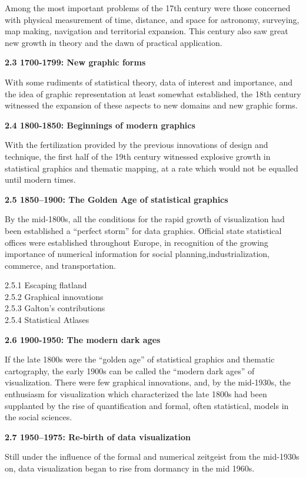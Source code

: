 \documentclass[]{book}
\theoremstyle{definition}
\theoremstyle{definition}
\theoremstyle{definition}
\theoremstyle{remark}
\begin{document}
Among the most important problems of the 17th century were those
concerned with physical measurement of time, distance, and space for
astronomy, surveying, map making, navigation and territorial expansion.
This century also saw great new growth in theory and the dawn of
practical application.

\textbf{2.3 1700-1799: New graphic forms}

With some rudiments of statistical theory, data of interest and
importance, and the idea of graphic representation at least somewhat
established, the 18th century witnessed the expansion of these aspects
to new domains and new graphic forms.

\textbf{2.4 1800-1850: Beginnings of modern graphics}

With the fertilization provided by the previous innovations of design
and technique, the first half of the 19th century witnessed explosive
growth in statistical graphics and thematic mapping, at a rate which
would not be equalled until modern times.

\textbf{2.5 1850--1900: The Golden Age of statistical graphics}

By the mid-1800s, all the conditions for the rapid growth of
visualization had been established a ``perfect storm'' for data
graphics. Official state statistical offices were established throughout
Europe, in recognition of the growing importance of numerical
information for social planning,industrialization, commerce, and
transportation.

2.5.1 Escaping flatland\\
2.5.2 Graphical innovations\\
2.5.3 Galton's contributions\\
2.5.4 Statistical Atlases

\textbf{2.6 1900-1950: The modern dark ages}

If the late 1800s were the ``golden age'' of statistical graphics and
thematic cartography, the early 1900s can be called the ``modern dark
ages'' of visualization. There were few graphical innovations, and, by
the mid-1930s, the enthusiasm for visualization which characterized the
late 1800s had been supplanted by the rise of quantification and formal,
often statistical, models in the social sciences.

\textbf{2.7 1950--1975: Re-birth of data visualization}

Still under the influence of the formal and numerical zeitgeist from the
mid-1930s on, data visualization began to rise from dormancy in the mid
1960s.
\end{document}
